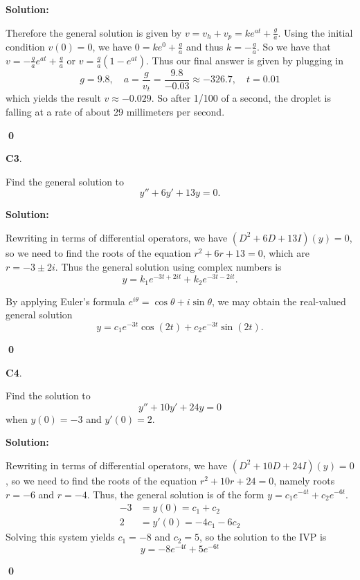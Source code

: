 \documentclass{article}
\newenvironment{problem}[1]
{
  \begin{flushleft}
  \textbf{#1}.
  \ignorespaces
}
{
  \end{flushleft}
}
\newenvironment{solution}
{
  \ignorespaces
  \textbf{Solution:}
}
{
  \ignorespacesafterend
  \begin{flushright}
  {\bfseries \qed}
  \end{flushright}
}
\begin{document}
\begin{solution}
\begin{enumerate}[(a)]
Therefore the general solution is given by \(v=v_h+v_p=ke^{at}+\frac{g}{a}\).
Using the initial condition \(v(0)=0\), we have \(0=ke^0+\frac{g}{a}\)
and thus \(k=-\frac{g}{a}\). So we have that \(v=-\frac{g}{a}e^{at}+\frac{g}{a}\)
or \(v=\frac{g}{a}(1-e^{at})\).
Thus our final answer is given by plugging in 
\[
g=9.8,\hspace{1em}
a=\frac{g}{v_t}=\frac{9.8}{-0.03}\approx-326.7,\hspace{1em}
t=0.01
\]
which yields the result \(v\approx -0.029\). So after 1/100 of a second,
the droplet is falling at a rate of about 29 millimeters per second.
\end{enumerate}
\end{solution}


\begin{problem}{C3}
Find the general solution to \[y''+6y'+13y=0.\]
\end{problem}
\begin{solution}
Rewriting in terms of differential operators, we have \( (D^2+6D+13I)(y)=0\), so we need to find the roots of the equation
\(r^2+6r+13=0\), which are  \(r=-3\pm2i\).
Thus the general solution using complex numbers is \[y=k_1e^{-3t+2it}+k_2e^{-3t-2it}.\]

By applying Euler's formula \(e^{i\theta}=\cos\theta+i\sin\theta\), we may
obtain the real-valued general solution
\[ y= c_1 e^{-3t} \cos(2t) + c_2 e^{-3t} \sin(2t) .\]
\end{solution}

\begin{problem}{C4}
Find the solution to
\[
y'' + 10y' + 24y = 0
\]
when \(y(0)=-3\) and \(y'(0)=2\).
\end{problem}
\begin{solution}
Rewriting in terms of differential operators, we have \( (D^2+10D+24I)(y)=0\), so we need to find the roots of the equation \(r^2+10r+24=0\), namely roots \(r=-6\) and \(r=-4\).  Thus, the general solution is of the form \(y=c_1e^{-4t}+c_2e^{-6t}\).  
\begin{align*}
-3 &= y(0) = c_1+c_2 \\
2 &= y'(0)  = -4c_1-6c_2 
\end{align*}
Solving this system yields \(c_1 =-8\) and \(c_2 = 5\), so the solution to the IVP is \[y=-8e^{-4t}+5e^{-6t}\]
\end{solution}
\end{document}
